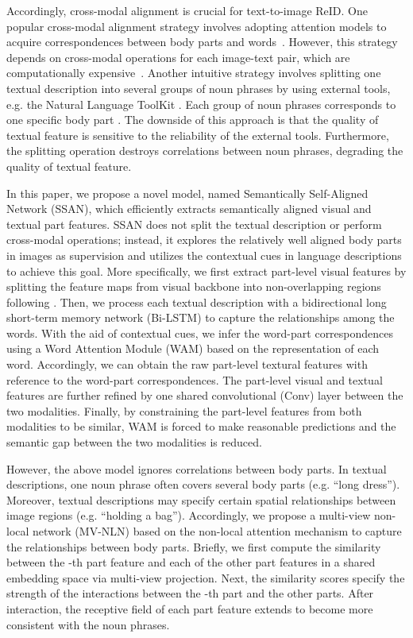 \documentclass[journal]{IEEEtran}
\begin{document}
Accordingly, cross-modal alignment is crucial for text-to-image ReID.
One popular cross-modal alignment strategy involves adopting attention models to acquire correspondences between body parts and words~\cite{li2017person,li2017identity,chen2018improving}.
However, this strategy depends on cross-modal operations for each image-text pair, which are computationally expensive~\cite{qu2020context}.
Another intuitive strategy involves splitting one textual description into several groups of noun phrases by using external tools, e.g. the Natural Language ToolKit \cite{loper2002nltk}.
Each group of noun phrases corresponds to one specific body part \cite{jing2020pose,niu2020improving,wang2020vitaa}.
The downside of this approach is that the quality of textual feature is sensitive to the reliability of the external tools.
Furthermore, the splitting operation destroys correlations between noun phrases, degrading the quality of textual feature.

In this paper, we propose a novel model, named Semantically Self-Aligned Network (SSAN), which efficiently extracts semantically aligned visual and textual part features.
SSAN does not split the textual description or perform cross-modal operations;
instead, it explores the relatively well aligned body parts in images as supervision and utilizes the contextual cues in language descriptions to achieve this goal.
More specifically, we first extract part-level visual features by splitting the feature maps from visual backbone into non-overlapping regions following \cite{sun2018beyond}.
Then, we process each textual description with a bidirectional long short-term memory network (Bi-LSTM) \cite{hochreiter1997long} to capture the relationships among the words.
With the aid of contextual cues, we infer the word-part correspondences using a Word Attention Module (WAM) based on the representation of each word.
Accordingly, we can obtain the raw part-level textural features with reference to the word-part correspondences.
The part-level visual and textual features are further refined by one shared  convolutional (Conv) layer between the two modalities.
Finally, by constraining the part-level features from both modalities to be similar, WAM is forced to make reasonable predictions and the semantic gap between the two modalities is reduced.

However, the above model ignores correlations between body parts. In textual descriptions, one noun phrase often covers several body parts (e.g. ``long dress''). Moreover, textual descriptions may specify certain spatial relationships between image regions (e.g. ``holding a bag''). Accordingly, we propose a multi-view non-local network (MV-NLN) based on the non-local attention mechanism \cite{wang2018non} to capture the relationships between body parts. Briefly, we first compute the similarity between the -th part feature and each of the other part features in a shared embedding space via multi-view projection. Next, the similarity scores specify the strength of the interactions between the -th part and the other parts. After interaction, the receptive field of each part feature extends to become more consistent with the noun phrases.
\end{document}
